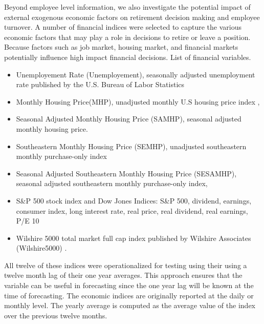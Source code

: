 \documentclass[12pt,letterpaper]{article}
\begin{document}
Beyond employee level information, we also investigate the potential impact of external exogenous economic factors on retirement decision making and employee turnover.  A number of financial indices were selected to capture the various economic factors that may play a role in decisions to retire or leave a position.  Because factors such as job market, housing market, and financial markets potentially influence high impact financial decisions.
List of financial variables.
\begin{itemize}
	\item Unemployement Rate (Unemployement),  seasonally adjusted unemployment rate published by the U.S. Bureau of Labor Statistics \citep{unemployment}
	\item Monthly Housing Price(MHP), unadjusted monthly U.S housing price index \citep{HPI},
	\item Seasonal Adjusted Monthly Housing Price (SAMHP), seasonal adjusted monthly housing price.
	\item Southeastern Monthly Housing Price (SEMHP), unadjusted southeastern monthly purchase-only index
	\item Seasonal Adjusted Southeastern Monthly Housing Price (SESAMHP), seasonal adjusted southeastern monthly purchase-only index,
	\item S\&P 500 stock index and Dow Jones Indices: S\&P 500, dividend, earnings, consumer index, long interest rate, real price, real dividend, real earnings, P/E 10 \citep{sp500}
   \item Wilshire 5000 total market full cap index published by Wilshire Associates (Wilshire5000) \citep{will5000}.
\end{itemize}
All twelve of these indices were operationalized for testing using their using a twelve month lag of their one year averages.  This approach ensures that the variable can be useful in forecasting since the one year lag will be known at the time of forecasting.  The economic indices are originally reported at the daily or monthly level. The yearly average is computed as the average value of the index over the previous twelve months.

\end{document}
